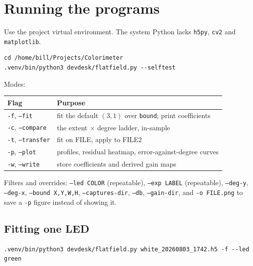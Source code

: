 \documentclass[11pt, a4paper]{article}
\newcommand{\code}[1]{\texttt{#1}}
\begin{document}
\section{Running the programs}
\label{sec:running}

Use the project virtual environment.
The system Python lacks \code{h5py}, \code{cv2} and \code{matplotlib}.

\begin{verbatim}
cd /home/bill/Projects/Colorimeter
.venv/bin/python3 devdesk/flatfield.py --selftest
\end{verbatim}

\noindent
Modes:

\begin{center}
\begin{tabular}{ll}
\toprule
Flag & Purpose \\
\midrule
\code{-f}, \code{--fit}      & fit the default $(3,1)$ over \code{bound};
                               print coefficients \\
\code{-c}, \code{--compare}  & the extent $\times$ degree ladder, in-sample \\
\code{-t}, \code{--transfer} & fit on FILE, apply to FILE2 \\
\code{-p}, \code{--plot}     & profiles, residual heatmap,
                               error-against-degree curves \\
\code{-w}, \code{--write}    & store coefficients and derived gain maps \\
\bottomrule
\end{tabular}
\end{center}

\noindent
Filters and overrides:
\code{--led COLOR} (repeatable),
\code{--exp LABEL} (repeatable),
\code{--deg-y}, \code{--deg-x},
\code{--bound X,Y,W,H},
\code{--captures-dir}, \code{--db}, \code{--gain-dir},
and \code{-o FILE.png} to save a \code{-p} figure instead of showing it.

\subsection{Fitting one LED}

\begin{verbatim}
.venv/bin/python3 devdesk/flatfield.py white_20260803_1742.h5 -f --led green
\end{verbatim}
\end{document}

